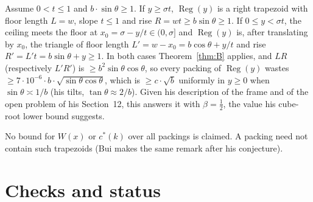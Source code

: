 \documentclass[11pt,letterpaper]{amsart}
\theoremstyle{plain}
\theoremstyle{definition}
\theoremstyle{remark}
\newcommand{\cs}{c^{*}}
\begin{document}
Assume $0<t\le1$ and $b\cdot\sin\theta\ge1$. If $y\ge\sigma t$, $\operatorname{Reg}(y)$ is a right trapezoid with floor length $L=w$, slope $t\le1$ and rise $R=wt\ge b\sin\theta\ge1$. If $0\le y<\sigma t$, the ceiling meets the floor at $x_0=\sigma-y/t\in(0,\sigma]$ and $\operatorname{Reg}(y)$ is, after translating by $x_0$, the triangle of floor length $L'=w-x_0=b\cos\theta+y/t$ and rise $R'=L't=b\sin\theta+y\ge1$. In both cases Theorem~\ref{thm:B} applies, and $LR$ (respectively $L'R'$) is $\ge b^2\sin\theta\cos\theta$, so every packing of $\operatorname{Reg}(y)$ wastes $\ge7\cdot10^{-6}\cdot b\cdot\sqrt{\sin\theta\cos\theta}$, which is $\ge c\cdot\sqrt b$ uniformly in $y\ge0$ when $\sin\theta\asymp1/b$ (his tilts, $\tan\theta\approx2/b$). Given his description of the frame and of the open problem of his Section~12, this answers it with $\beta=\tfrac12$, the value his cube-root lower bound \cite{Ryu26b} suggests.

No bound for $W(x)$ or $\cs(k)$ over all packings is claimed. A packing need not contain such trapezoids (Bui makes the same remark after his conjecture).

\section{Checks and status}

\end{document}
